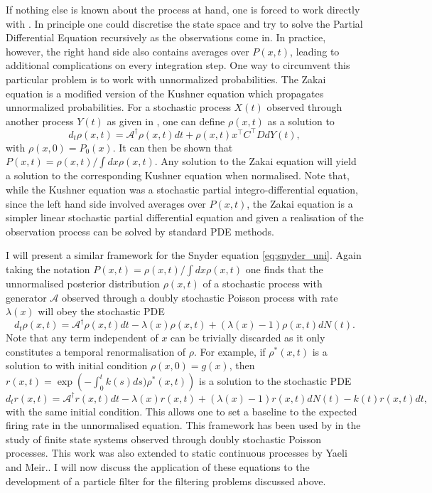 {If nothing else is known about the process at hand, one is forced to work directly with . In principle one could discretise the state space and try to 
solve the Partial Differential Equation recursively as the observations come in. In practice, however, 
the right hand side  also contains averages over $P(x,t)$, leading to additional complications on every integration step. One way to circumvent this 
particular problem is to work with unnormalized probabilities. The Zakai equation is a modified version of the Kushner equation which propagates 
unnormalized probabilities. For a stochastic process $X(t)$ observed through another process $Y(t)$ as given in , one can define $\rho(x,t)$ as a solution to
\begin{equation}
\label{eq:zakai}
d_t\rho(x,t) = \mathcal{A}^\dagger \rho(x,t) dt+ \rho(x,t) x^\top C^\top D dY(t),
\end{equation}
with $\rho(x,0) = P_0(x)$. It can then be shown that $P(x,t) = \rho(x,t)/\int dx \rho(x,t)$.
Any solution to the Zakai equation will yield a solution to the corresponding Kushner equation when normalised.
Note that, while the Kushner equation was a stochastic partial integro-differential equation, since the left hand side involved averages over $P(x,t)$, the Zakai equation is 
a simpler linear stochastic partial differential equation and given a realisation of the observation process can be solved by standard PDE methods.
\par
I will present a similar framework for the Snyder equation \ref{eq:snyder_uni}. Again taking the notation $P(x,t) = \rho(x,t) / \int dx \rho(x,t)$ one finds that the 
unnormalised posterior distribution $\rho(x,t)$ of a stochastic process with generator $\mathcal{A}$ observed through a doubly stochastic Poisson process with 
rate 
$\lambda(x)$ will obey the stochastic PDE
\begin{equation}
\label{eq:zakai_snyder}
d_t\rho(x,t) = \mathcal{A}^\dagger \rho(x,t) dt -\lambda(x) \rho(x,t) + \left(\lambda(x) -1 \right)\rho(x,t) dN(t).
\end{equation}
Note that any term independent of $x$ can be trivially discarded as it only constitutes a temporal renormalisation of $\rho$. For example, if $\rho^*(x,t)$ is a solution to
 with initial condition $\rho(x,0) = g(x)$, then $r(x,t) = \exp\left(-\int_0^t k(s) ds ) \rho^*(x,t)\right)$ is a solution to the stochastic PDE
\[
d_t r(x,t) = \mathcal{A}^\dagger r(x,t) dt -\lambda(x) r(x,t) + \left(\lambda(x) -1 \right) r(x,t) dN(t) -k(t) r(x,t) dt,
\]
with the same initial condition.
This allows one to set a baseline to the expected firing rate in the unnormalised equation. This framework has been used by  in
the study of finite state systems observed through doubly stochastic Poisson processes. This work was also extended to static continuous processes by 
Yaeli and Meir.. I will now discuss the application of these equations to the development of a particle filter for the filtering problems discussed above.


}
